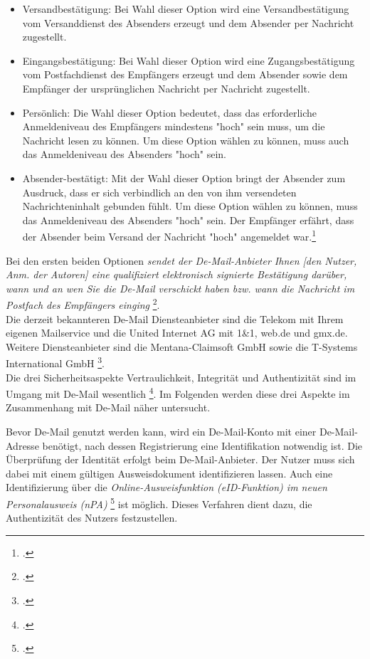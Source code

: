 \documentclass  [paper=a4,
				fontsize=12pt,
				listof=totoc,
				bibliography=totoc
				]{scrreprt}
\begin{document}
{			\begin{itemize}
				\item Versandbestätigung: Bei Wahl dieser Option wird eine Versandbestätigung vom Versanddienst des Absenders erzeugt und dem Absender per Nachricht zugestellt.
				\item Eingangsbestätigung: Bei Wahl dieser Option wird eine Zugangsbestätigung vom Postfachdienst des Empfängers erzeugt und dem Absender sowie dem Empfänger der ursprünglichen Nachricht per Nachricht zugestellt.
				\item Persönlich: Die Wahl dieser Option bedeutet, dass das erforderliche Anmeldeniveau des Empfängers mindestens "hoch" sein muss, um die Nachricht lesen zu können. Um diese Option wählen zu können, muss auch das Anmeldeniveau des Absenders "hoch" sein.
				\item Absender-bestätigt: Mit der Wahl dieser Option bringt der Absender zum Ausdruck, dass er sich verbindlich an den von ihm versendeten Nachrichteninhalt gebunden fühlt. Um diese Option wählen zu können, muss das Anmeldeniveau des Absenders "hoch" sein. Der Empfänger erfährt, dass der Absender beim Versand der Nachricht "hoch" angemeldet war.\footcite{BSIMerkmale}
			\end{itemize}
			Bei den ersten beiden Optionen \textit{\glqq sendet der De-Mail-Anbieter Ihnen [den Nutzer, Anm. der Autoren] eine qualifiziert elektronisch signierte Bestätigung darüber, wann und an wen Sie die De-Mail verschickt haben bzw. wann die Nachricht im Postfach des Empfängers einging\grqq} \footcite{BSIDeMail, S. 15}.\medskip\\
			
			Die derzeit bekannteren De-Mail Diensteanbieter sind die Telekom mit Ihrem eigenen Mailservice und die United Internet AG mit 1\&1, web.de und gmx.de.
			Weitere Diensteanbieter sind die Mentana-Claimsoft GmbH sowie die T-Systems International GmbH \footcite{BSIDiensteanbieter}.\medskip\\
			
			Die drei Sicherheitsaspekte Vertraulichkeit, Integrität und Authentizität sind im Umgang mit De-Mail wesentlich \footcite{BSIGrundlagen}.
			Im Folgenden werden diese drei Aspekte im Zusammenhang mit De-Mail näher untersucht.
			
			Bevor De-Mail genutzt werden kann, wird ein De-Mail-Konto mit einer De-Mail-Adresse benötigt, nach dessen Registrierung eine Identifikation notwendig ist.
			Die Überprüfung der Identität erfolgt beim De-Mail-Anbieter.
			Der Nutzer muss sich dabei mit einem gültigen Ausweisdokument identifizieren lassen.
			Auch eine Identifizierung über die \textit{\glqq Online-Ausweisfunktion (eID-Funktion) im neuen Personalausweis (nPA)\grqq} \footcite[Vgl.][S. 13]{BSIDeMail} ist möglich.
			Dieses Verfahren dient dazu, die Authentizität des Nutzers festzustellen.\medskip\\
			
}
\end{document}
